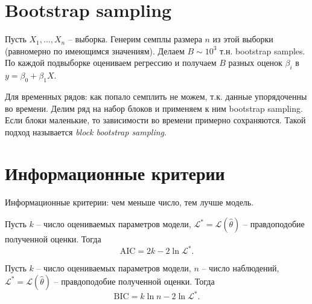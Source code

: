 \begin{appendices}
    \section{Bootstrap sampling}
        Пусть $X_1, \dots, X_n$ -- выборка. Генерим семплы размера $n$ из этой выборки (равномерно по имеющимся значениям). Делаем $B\sim 10^3$ т.н. bootstrap samples.
        По каждой подвыборке оцениваем регрессию и получаем $B$ разных оценок $\beta_i$ в $y = \beta_0 + \beta_1 X$.

        Для временных рядов: как попало семплить не можем, т.к. данные упорядоченны во времени.
        Делим ряд на набор блоков и применяем к ним bootstrap sampling. Если блоки маленькие, то зависимости во времени примерно сохраняются. 
        Такой подход называется \emph{block bootstrap sampling}.

    \section{Информационные критерии}
        Информационные критерии: чем меньше число, тем лучше модель.
        \begin{definition}
            Пусть $k$ -- число оцениваемых параметров модели, $\mathcal{L}^* = \mathcal{L}(\hat\theta)$ -- правдоподобие полученной оценки. Тогда 
            \begin{equation*}
                \mathrm{AIC} = 2k - 2\ln \mathcal{L}^*.
            \end{equation*}
        \end{definition}

        \begin{definition}
            Пусть $k$ -- число оцениваемых параметров модели, $n$ -- число наблюдений, $\mathcal{L}^* = \mathcal{L}(\hat\theta)$ -- правдоподобие полученной оценки. Тогда 
            \begin{equation*}
                \mathrm{BIC} = k\ln n - 2\ln \mathcal{L}^*.
            \end{equation*}
        \end{definition}

        
\end{appendices}

